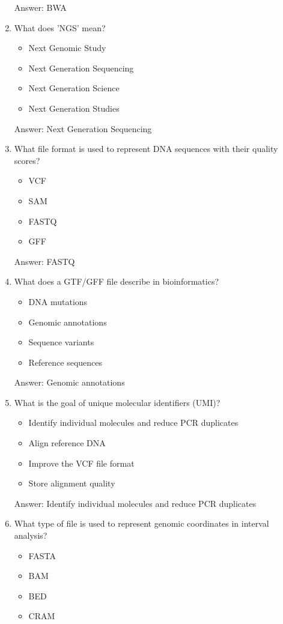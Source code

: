 \begin{enumerate}
Answer: BWA

\item What does 'NGS' mean?
\begin{itemize}
\item Next Genomic Study
\item Next Generation Sequencing
\item Next Generation Science
\item Next Generation Studies
\end{itemize}

Answer: Next Generation Sequencing

\item What file format is used to represent DNA sequences with their quality scores?
\begin{itemize}
\item VCF
\item SAM
\item FASTQ
\item GFF
\end{itemize}

Answer: FASTQ

\item What does a GTF/GFF file describe in bioinformatics?
\begin{itemize}
\item DNA mutations
\item Genomic annotations
\item Sequence variants
\item Reference sequences
\end{itemize}

Answer: Genomic annotations

\item What is the goal of unique molecular identifiers (UMI)?
\begin{itemize}
\item Identify individual molecules and reduce PCR duplicates
\item Align reference DNA
\item Improve the VCF file format
\item Store alignment quality
\end{itemize}

Answer: Identify individual molecules and reduce PCR duplicates

\item What type of file is used to represent genomic coordinates in interval analysis?
\begin{itemize}
\item FASTA
\item BAM
\item BED
\item CRAM
\end{itemize}


\end{enumerate}
